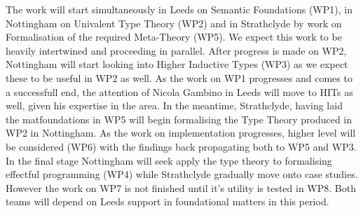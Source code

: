 \documentclass[a4paper]{article}
\begin{document}
{\centering
{}
}

\bigskip
The work will start simultaneously in Leeds on Semantic
Foundations (WP1), in Nottingham on Univalent Type Theory (WP2) and in
Strathclyde by work on Formalisation of the required Meta-Theory
(WP5). We expect this work to be heavily intertwined and proceeding in
parallel. After progress is made on WP2, Nottingham will start looking
into Higher Inductive Types (WP3) as we expect these to be useful in
WP2 as well. As the work on WP1 progresses and comes to a successfull
end, the attention of Nicola Gambino in Leeds will move to HITs as
well, given his expertise in the area. In the meantime, Strathclyde,
having laid the matfoundations in WP5 will begin formalising the Type
Theory produced in WP2 in Nottingham. As the work on implementation
progresses, higher level will be considered (WP6) with the findings
back propagating both to WP5 and WP3. In the final stage Nottingham
will seek apply the type theory to formalising effectful programming
(WP4) while Strathclyde gradually move onto case studies. However the
work on WP7 is not finished until it's utility is tested in WP8. Both
teams will depend on Leeds support in foundational matters in this period. 
\end{document}
